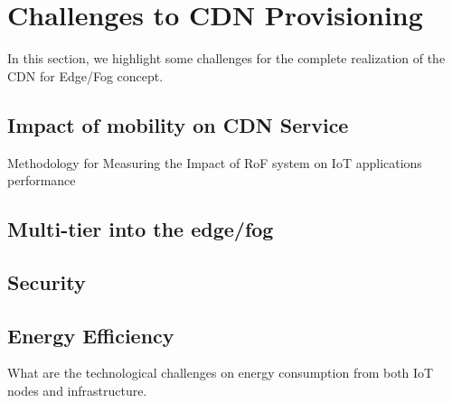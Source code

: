 
\section{Challenges to CDN Provisioning}
\label{sec:Challenges}

In this section, we highlight some challenges for the complete realization of the CDN for Edge/Fog concept.

\subsection{Impact of mobility on CDN Service}

Methodology for Measuring the Impact of RoF system on IoT applications performance

\subsection{Multi-tier into the edge/fog}

\subsection{Security}

\subsection{Energy Efficiency}

What are the technological challenges on energy consumption from both IoT nodes and infrastructure.
	